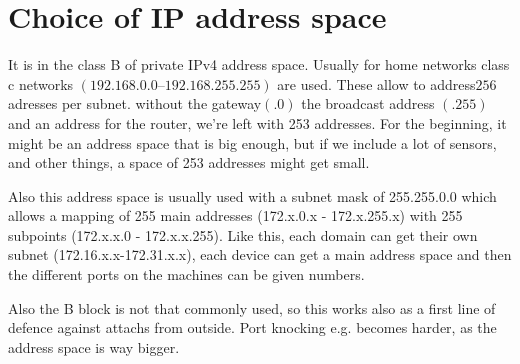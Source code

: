 \chapter{Choice of IP address space}

 
It is in the class B of private IPv4 address space. Usually for home networks class c networks $ (192.168.0.0 – 192.168.255.255) $ are used. These allow to address$  256 $ adresses per subnet. without the gateway$  (.0) $ the broadcast address $ (.255) $ and an address for the router, we're left with 253 addresses. 
For the beginning, it might be an address space that is big enough, but if we include a lot of sensors, and other things, a space of 253 addresses might get small. 
 
Also this address space is usually used with a subnet mask of 255.255.0.0 which allows a mapping of  255 main addresses (172.x.0.x - 172.x.255.x) with 255 subpoints (172.x.x.0 - 172.x.x.255). Like this, each domain can get their own subnet (172.16.x.x-172.31.x.x), each device can get a main address space and then the different ports on the machines can be given numbers.
 
Also the  B block is not that commonly used, so this works also as a first line of defence against attachs from outside. Port knocking e.g. becomes harder, as the address space is way bigger.